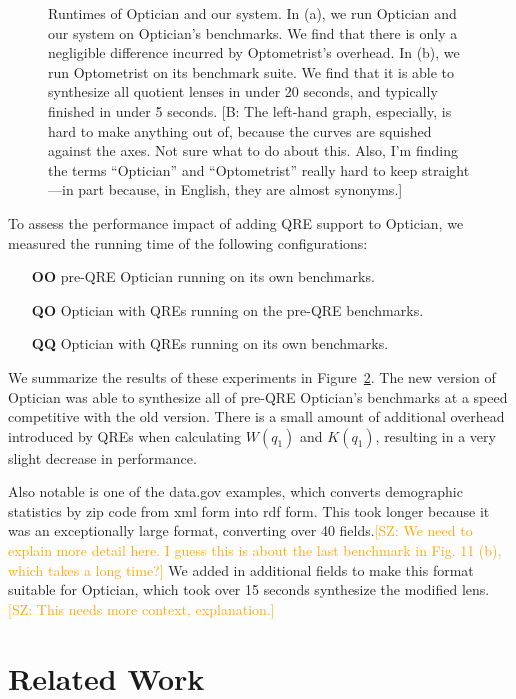 \documentclass[acmsmall,review,anonymous]{acmart}
\newcommand{\FINISH}[3]{\ifdraft\textcolor{#1}{[#2: #3]}\fi}
\newcommand{\bcp}[1]{\FINISH{dkred}{B}{#1}}
\newcommand{\saz}[1]{\FINISH{orange}{SZ}{#1}}
\newcommand{\OpticianRuntime}{\textbf{OO}}
\newcommand{\SystemOnOptician}{\textbf{QO}}
\newcommand{\SystemOnBenchmarks}{\textbf{QQ}}
\begin{document}
\begin{figure}[t]
\begin{subfigure}[b]{.49\textwidth}
\caption{}
\label{subfig:examplesused}
\end{subfigure}
\caption{Runtimes of Optician and our system.
In (a), we run Optician and our system on Optician's benchmarks.  We find that
there is only a negligible difference incurred by Optometrist's overhead.
In (b), we run Optometrist on its benchmark suite.  We find that it is able
to synthesize all quotient lenses in under 20 seconds, and typically
finished in under 5 seconds. \bcp{The left-hand graph, especially, is hard
  to make anything out of, because the curves are squished against the
  axes.  Not sure what to do about this.  Also, I'm finding the terms
  ``Optician'' and ``Optometrist'' really hard to keep straight---in part
  because, in English, they are almost synonyms.}}
\label{fig:times}
\end{figure}

To assess the performance impact of adding QRE support to Optician, we measured
the running time of the following configurations:
\begin{itemize}
  \item[\OpticianRuntime{}] pre-QRE Optician running on its own benchmarks.
  \item[\SystemOnOptician{}] Optician with QREs running on the pre-QRE benchmarks.
  \item[\SystemOnBenchmarks{}] Optician with QREs running on its own benchmarks.
\end{itemize}

We summarize the results of these experiments in Figure~\ref{fig:times}.  The
new version of Optician was able to synthesize all of pre-QRE Optician's
benchmarks at a speed competitive with the old version.  There is a small amount
of additional overhead introduced by QREs when calculating $W(q_1)$ and $K(q_1)$,
resulting in a very slight decrease in performance.

Also notable is one of the data.gov examples, which converts demographic
statistics by zip code from xml form into rdf form. This took longer because it
was an exceptionally large format, converting over 40 fields.\saz{We need to
  explain more detail here.  I guess this is about the last benchmark in Fig. 11
  (b), which takes a long time?}  We added in additional fields to make this
format suitable for Optician, which took over 15 seconds synthesize the modified
lens.\saz{This needs more context, explanation.}

\section{Related Work}
\label{relwork}
\end{document}
